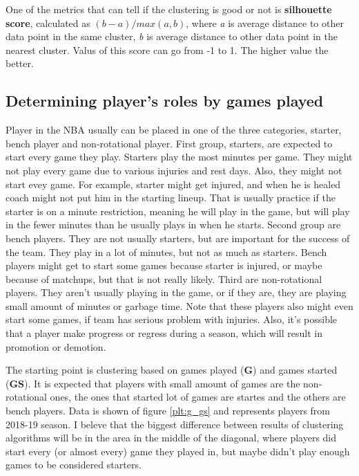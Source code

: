\documentclass[a4paper]{article}
\begin{document}
One of the metrics that can tell if the clustering is good or not is \textbf{silhouette score}, calculated as $ (b - a)  / max(a, b) $, where \textit{a} is average distance to other data point in the same cluster, \textit{b} is average distance to other data point in the nearest cluster. Valus of this score can go from -1 to 1. The higher value the better. \cite{clustering}

\subsection{Determining player's roles by games played}
\label{subsec:players_roles}

Player in the NBA usually can be placed in one of the three categories, starter, bench player and non-rotational player. First group, starters, are expected to start every game they play. Starters play the most minutes per game. They might not play every game due to various injuries and rest days. Also, they might not start evey game. For example, starter might get injured, and when he is healed coach might not put him in the starting lineup. That is usually practice if the starter is on a minute restriction, meaning he will play in the game, but will play in the fewer minutes than he usually plays in when he starts. Second group are bench players. They are not usually starters, but are important for the success of the team. They play in a lot of minutes, but not as much as starters. Bench players might get to start some games because starter is injured, or maybe because of matchups, but that is not really likely. Third are non-rotational players. They aren't usually playing in the game, or if they are, they are playing small amount of minutes or garbage time. Note that these players also might even start some games, if team has serious problem with injuries. Also, it's possible that a player make progress or regress during a season, which will result in promotion or demotion.

The starting point is clustering based on games played (\textbf{G}) and games started (\textbf{GS}). It is expected that players with small amount of games are the non-rotational ones, the ones that started lot of games are startes and the others are bench players. Data is shown of figure \ref{plt:g_gs} and represents players from 2018-19 season. I beleve that the biggest difference between results of clustering algorithms will be in the area in the middle of the diagonal, where players did start every (or almost every) game they played in, but maybe didn't play enough games to be considered starters.
\end{document}
